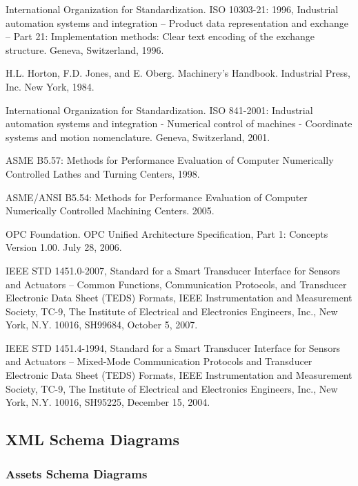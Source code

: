 International Organization for Standardization. ISO 10303-21: 1996, Industrial automation systems and integration -- Product data representation and exchange -- Part 21: Implementation methods: Clear text encoding of the exchange structure. Geneva, Switzerland, 1996.

H.L. Horton, F.D. Jones, and E. Oberg. Machinery's Handbook. Industrial Press, Inc. New York, 1984.

International Organization for Standardization. ISO 841-2001: Industrial automation systems and integration - Numerical control of machines - Coordinate systems and motion nomenclature. Geneva, Switzerland, 2001.

ASME B5.57: Methods for Performance Evaluation of Computer Numerically Controlled Lathes and Turning Centers, 1998.

ASME/ANSI B5.54: Methods for Performance Evaluation of Computer Numerically Controlled Machining Centers. 2005.

OPC Foundation. OPC Unified Architecture Specification, Part 1: Concepts Version 1.00. July 28, 2006.

IEEE STD 1451.0-2007, Standard for a Smart Transducer Interface for Sensors and Actuators – Common Functions, Communication Protocols, and Transducer Electronic Data Sheet (TEDS) Formats, IEEE Instrumentation and Measurement Society, TC-9, The Institute of Electrical and Electronics Engineers, Inc., New York, N.Y. 10016, SH99684, October 5, 2007.

IEEE STD 1451.4-1994, Standard for a Smart Transducer Interface for Sensors and Actuators – Mixed-Mode Communication Protocols and Transducer Electronic Data Sheet (TEDS) Formats, IEEE Instrumentation and Measurement Society, TC-9, The Institute of Electrical and Electronics Engineers, Inc., New York, N.Y. 10016, SH95225, December 15, 2004. \newpage

\subsection{XML Schema Diagrams}
\label{sec:XML Schema Diagrams}

\subsubsection{Assets Schema Diagrams}
\label{sec:Assets Schema Diagrams}

